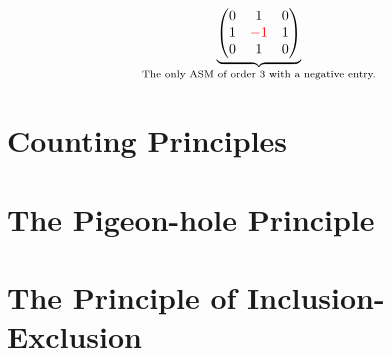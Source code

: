 \[
\underbrace{
\begin{pmatrix}
    0 & 1 & 0 \\
    1 & \textcolor{red}{-1} & 1 \\
    0 & 1 & 0
\end{pmatrix}
}_{\text{The only ASM of order $3$ with a negative entry.}}
\]

\section{Counting Principles}
\section{The Pigeon-hole Principle}
\section{The Principle of Inclusion-Exclusion}